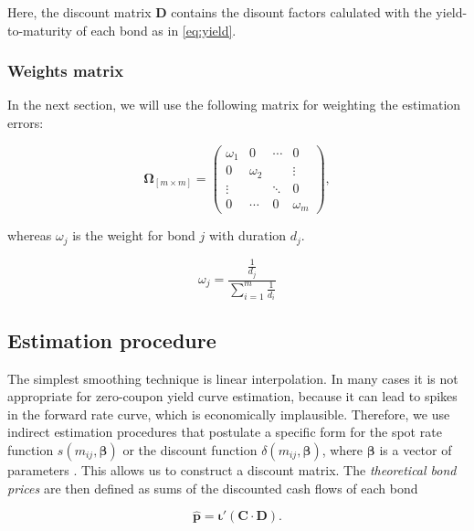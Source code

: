 Here, the discount matrix $\bm{D}$ contains the disount factors calulated with the yield-to-maturity of each bond as in \eqref{eq:yield}.

\subsubsection*{Weights matrix}

In the next section, we will use the following matrix for weighting the estimation errors:


\begin{equation*}\label{weights}
    \bm{\Omega}_{\left[m\times m\right]}= \begin{pmatrix}
 \omega_1 & 0 &\cdots  &0  \\
 0 & \omega_2 &  & \vdots \\
 \vdots &  & \ddots & 0 \\
 0 &\cdots  &0  & \omega_m
\end{pmatrix},
\end{equation*}


whereas $\omega_j$ is the weight for bond $j$ with duration $d_j$.

\begin{equation}
\label{eq:durationweight}
    \omega_j=\frac{\frac{1}{d_j}}{\sum_{i=1}^m\frac{1}{d_i}}
\end{equation}



\subsection{Estimation procedure}
\label{sec:estimation}

The simplest smoothing technique is linear interpolation. In many cases it is not appropriate for zero-coupon yield curve estimation, because it can lead to spikes in the forward rate curve, which is economically implausible. Therefore, we use indirect estimation procedures that postulate a specific form for the spot rate function $s(m_{ij}, \bm{\beta})$ or the discount function $\delta(m_{ij}, \bm{\beta})$, where $\bm{\beta}$ is a vector of parameters \citep[see, e.g.][]{Martellini2003}. This allows us to construct a discount matrix. The \emph{theoretical bond prices} are then defined as sums of the discounted cash flows of each bond

\begin{equation}
  \label{eq:theorprices}
  \bm{\hat{p}} = \bm{\iota}'(\bm{C}\cdot\bm{D}).
\end{equation}



